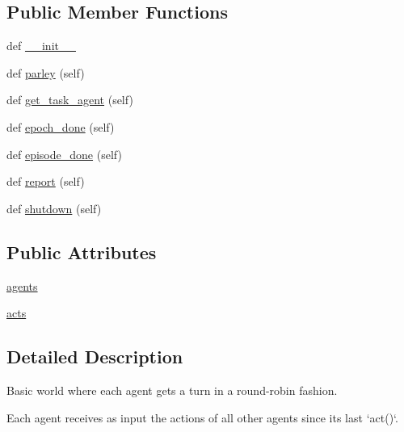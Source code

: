 \subsection*{Public Member Functions}
\begin{DoxyCompactItemize}
\item 
def \hyperlink{classparlai_1_1core_1_1worlds_1_1MultiAgentDialogWorld_a3c952cc9deaa918119027a5accc36e65}{\+\_\+\+\_\+init\+\_\+\+\_\+}
\item 
def \hyperlink{classparlai_1_1core_1_1worlds_1_1MultiAgentDialogWorld_a2b41d3026bc5afa04e7f874ba097b721}{parley} (self)
\item 
def \hyperlink{classparlai_1_1core_1_1worlds_1_1MultiAgentDialogWorld_a58ea065f63c441f27c97b6cb649ccf53}{get\+\_\+task\+\_\+agent} (self)
\item 
def \hyperlink{classparlai_1_1core_1_1worlds_1_1MultiAgentDialogWorld_ade057311db0368be26ac8b196619b862}{epoch\+\_\+done} (self)
\item 
def \hyperlink{classparlai_1_1core_1_1worlds_1_1MultiAgentDialogWorld_a341fb4b45fd697d9b0978cb1ed1b26d2}{episode\+\_\+done} (self)
\item 
def \hyperlink{classparlai_1_1core_1_1worlds_1_1MultiAgentDialogWorld_a686b237998ede0e9431dd58bca2b34c1}{report} (self)
\item 
def \hyperlink{classparlai_1_1core_1_1worlds_1_1MultiAgentDialogWorld_a02b4cbd9d41fde087fb4f0b11d6479a5}{shutdown} (self)
\end{DoxyCompactItemize}
\subsection*{Public Attributes}
\begin{DoxyCompactItemize}
\item 
\hyperlink{classparlai_1_1core_1_1worlds_1_1MultiAgentDialogWorld_a05fc93525cb86edef121980fc55f9926}{agents}
\item 
\hyperlink{classparlai_1_1core_1_1worlds_1_1MultiAgentDialogWorld_a99b292b010250515b1690aeb03cf614b}{acts}
\end{DoxyCompactItemize}


\subsection{Detailed Description}
\begin{DoxyVerb}Basic world where each agent gets a turn in a round-robin fashion.

Each agent receives as input the actions of all other agents since its last `act()`.
\end{DoxyVerb}
 

